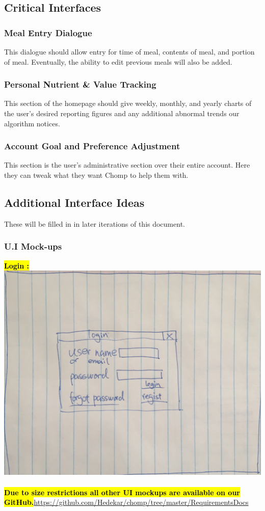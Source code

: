 \documentclass[a4paper,12pt]{article}
\begin{document}
\subsection{Critical Interfaces}
\subsubsection{Meal Entry Dialogue}
This dialogue should allow entry for time of meal, contents of meal, and portion of meal.  Eventually, the ability to edit previous meals will also be added.
\subsubsection{Personal Nutrient \& Value Tracking}
This section of the homepage should give weekly, monthly, and yearly charts of the user's desired reporting figures and any additional abnormal trends our algorithm notices.
\subsubsection{Account Goal and Preference Adjustment}
This section is the user's administrative section over their entire account.  Here they can tweak what they want Chomp to help them with.
\subsection{Additional Interface Ideas}
These will be filled in in later iterations of this document.
\subsubsection{U.I Mock-ups}
\hl{\textbf{Login :}}\\
\includegraphics[scale=0.3]{login.png}\\
\\
\hl{\textbf{Due to size restrictions all other UI mockups are available on our GitHub.}}\url{https://github.com/Hedekar/chomp/tree/master/RequirementsDocs}
\end{document}
